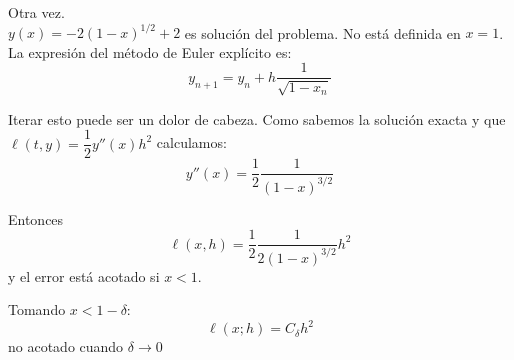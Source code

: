 \documentclass[openany]{book}
\begin{document}





        
        



    \setcounter{ex}{11}

    \begin{exercise}
        Otra vez.\\
        $ y(x) = -2(1-x)^{1/2} +2$ es solución del problema. No está definida en $ x = 1 $. La expresión del método de Euler explícito es:
        $$ y_{n+1} = y_n + h \dfrac{1}{\sqrt{1-x_n}} $$
        
        Iterar esto puede ser un dolor de cabeza. Como sabemos la solución exacta y que $ \ell(t,y) = \dfrac{1}{2} y''(x) h^2 $ calculamos:
        $$ y''(x) = \dfrac{1}{2} \dfrac{1}{(1-x)^{3/2}} $$
        
        Entonces
        $$ \ell(x,h) = \dfrac{1}{2}\dfrac{1}{2(1-x)^{3/2}}h^2 $$
        y el error está acotado si $ x < 1 $.
        
        Tomando $ x < 1-\delta $:
        $$ \ell(x;h) = C_{\delta}h^2 $$
        no acotado cuando $ \delta \to 0 $
    \end{exercise}
\end{document}
